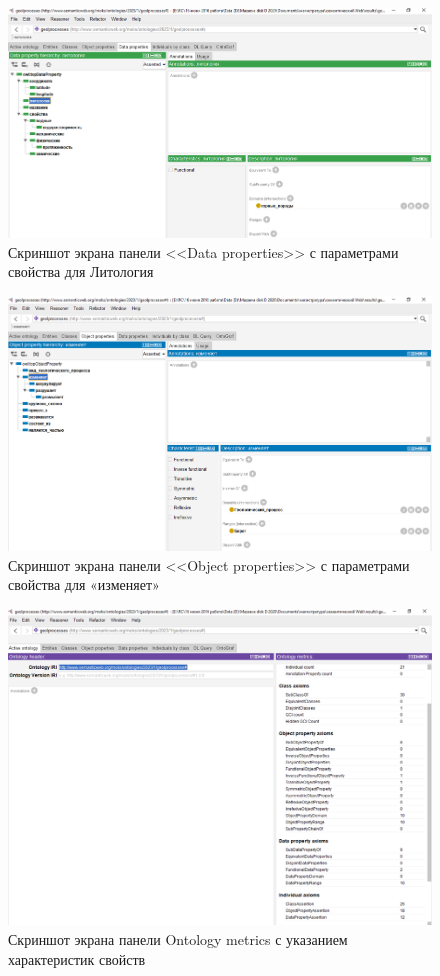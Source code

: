 \documentclass[732,fontsize=14pt,final]{studrep}
\begin{document}
  \begin{figure}[htp]
	\centering
	\includegraphics[width=0.9\linewidth]{pics/image24.png}
    \caption{Скриншот экрана панели <<Data properties>> с параметрами свойства для Литология}
    \label{fig:data-props}
  \end{figure}

  \begin{figure}[htp]
	\centering
	\includegraphics[width=0.9\linewidth]{pics/image10.png}
    \caption{Скриншот экрана панели <<Object properties>> с параметрами свойства для «изменяет»}
    \label{fig:obj-props}
  \end{figure}

  \begin{figure}[htp]
	\centering
	\includegraphics[width=0.9\linewidth]{pics/image19.png}
    \caption{Скриншот экрана панели Ontology metrics с указанием характеристик свойств}
    \label{fig:onto-metrics}
  \end{figure}
\end{document}
